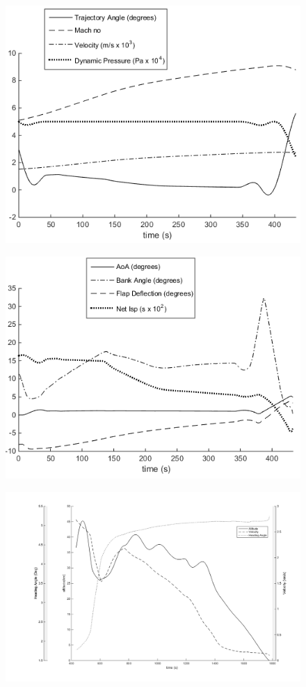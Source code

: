 \begin{figure}
	\centering
	\includegraphics[width=0.7\linewidth]{figures/7_Full/Ascent-Aero}
	\caption{}
	\label{fig:ascent-aero}
\end{figure}
\begin{figure}
	\centering
	\includegraphics[width=0.7\linewidth]{figures/7_Full/Ascent-Vehicle}
	\caption{}
	\label{fig:ascent-vehicle}
\end{figure}


\begin{figure}
	\centering
	\includegraphics[width=0.7\linewidth]{figures/7_Full/FlyBack1}
	\caption{}
	\label{fig:flyback1}
\end{figure}






